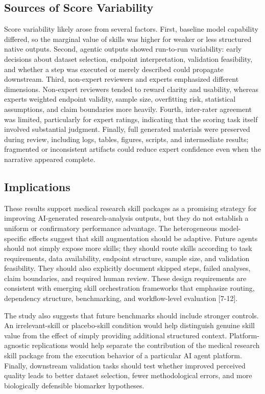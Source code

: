 \documentclass[11pt]{article}
\begin{document}
\subsection{Sources of Score Variability}

Score variability likely arose from several factors. First, baseline model capability differed, so the marginal value of skills was higher for weaker or less structured native outputs. Second, agentic outputs showed run-to-run variability: early decisions about dataset selection, endpoint interpretation, validation feasibility, and whether a step was executed or merely described could propagate downstream. Third, non-expert reviewers and experts emphasized different dimensions. Non-expert reviewers tended to reward clarity and usability, whereas experts weighted endpoint validity, sample size, overfitting risk, statistical assumptions, and claim boundaries more heavily. Fourth, inter-rater agreement was limited, particularly for expert ratings, indicating that the scoring task itself involved substantial judgment. Finally, full generated materials were preserved during review, including logs, tables, figures, scripts, and intermediate results; fragmented or inconsistent artifacts could reduce expert confidence even when the narrative appeared complete.

\subsection{Implications}

These results support medical research skill packages as a promising strategy for improving AI-generated research-analysis outputs, but they do not establish a uniform or confirmatory performance advantage. The heterogeneous model-specific effects suggest that skill augmentation should be adaptive. Future agents should not simply expose more skills; they should route skills according to task requirements, data availability, endpoint structure, sample size, and validation feasibility. They should also explicitly document skipped steps, failed analyses, claim boundaries, and required human review. These design requirements are consistent with emerging skill orchestration frameworks that emphasize routing, dependency structure, benchmarking, and workflow-level evaluation [7-12].

The study also suggests that future benchmarks should include stronger controls. An irrelevant-skill or placebo-skill condition would help distinguish genuine skill value from the effect of simply providing additional structured context. Platform-agnostic replications would help separate the contribution of the medical research skill package from the execution behavior of a particular AI agent platform. Finally, downstream validation tasks should test whether improved perceived quality leads to better dataset selection, fewer methodological errors, and more biologically defensible biomarker hypotheses.
\end{document}
